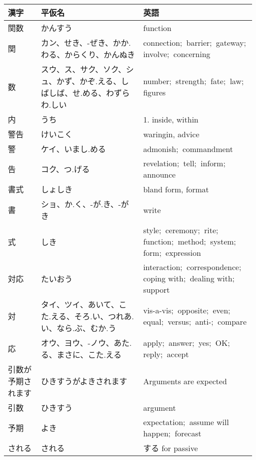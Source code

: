 \documentclass[12pt,a4paper,english,twoside]{article}
\begin{document}
\begin{CJK}{UTF8}{min}
\begin{tabular}{p{1in}p{2in}p{3in}}
\bf 漢字&\bf 平仮名&\bf 英語\\\hline\hline\hline
関数&かんすう&function\\\hline
関&カン、せき、-ぜき、かか.わる、からくり、かんぬき&connection;  barrier;  gateway;  involve;  concerning\\\hline
数&スウ、ス、サク、ソク、シュ、かず、かぞ.える、しばしば、せ.める、わずらわ.しい&number;  strength;  fate;  law;  figures\\\hline\hline
内&うち&1. inside, within\\\hline\hline
警告&けいこく&waringin, advice\\\hline
警&ケイ、いまし.める&admonish;  commandment\\\hline
告&コク、つ.げる&revelation;  tell;  inform;  announce\\\hline\hline
書式&しょしき&bland form, format\\\hline
書&ショ、か.く、-が.き、-がき&write\\\hline
式&しき&style;  ceremony;  rite;  function;  method;  system;  form;  expression\\\hline\hline
対応&たいおう&interaction;  correspondence;  coping with;  dealing with;  support\\\hline
対&タイ、ツイ、あいて、こた.える、そろ.い、つれあ.い、なら.ぶ、むか.う&vis-a-vis;  opposite;  even;  equal;  versus;  anti-;  compare\\\hline
応&オウ、ヨウ、-ノウ、あた.る、まさに、こた.える&apply;  answer;  yes;  OK;  reply;  accept\\\hline\hline
引数が予期されます&ひきすうがよきされます&Arguments are expected\\\hline
引数&ひきすう&argument\\\hline
予期&よき&expectation;  assume will happen;  forecast\\\hline
される&される&する for passive\\\hline\hline
\end{tabular}

\end{CJK}
\end{document}

